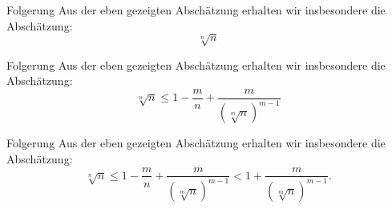 \documentclass[10pt]{beamer}
\begin{document}
\begin{frame}{Folgerung}
    Aus der eben gezeigten Abschätzung erhalten wir insbesondere die Abschätzung:
    \[
        \sqrt[n]{n}
    \]
\end{frame}



\begin{frame}{Folgerung}
    Aus der eben gezeigten Abschätzung erhalten wir insbesondere die Abschätzung:
    \[
        \sqrt[n]{n}
        \leq 1 - \frac{m}{n} + \frac{m}{\left( \sqrt[m]{n} \right)^{m - 1}}
    \]
\end{frame}



\begin{frame}{Folgerung}
    Aus der eben gezeigten Abschätzung erhalten wir insbesondere die Abschätzung:
    \[
        \sqrt[n]{n}
        \leq 1 - \frac{m}{n} + \frac{m}{\left( \sqrt[m]{n} \right)^{m - 1}}
        < 1 + \frac{m}{\left( \sqrt[m]{n} \right)^{m - 1}}.
    \]
\end{frame}

\end{document}
